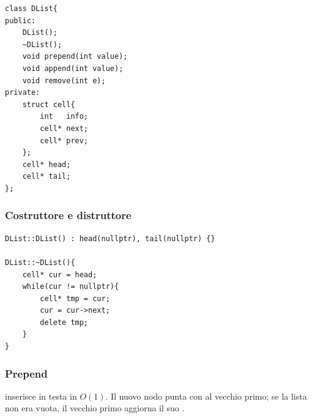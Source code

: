 \begin{codebox}
    \begin{lstlisting}
class DList{
public:
    DList();
    ~DList();
    void prepend(int value);
    void append(int value);
    void remove(int e);
private:
    struct cell{
        int   info;
        cell* next;
        cell* prev;
    };
    cell* head;
    cell* tail;
};
    \end{lstlisting}
\end{codebox}

\subsubsection{Costruttore e distruttore}

\begin{codebox}
    \begin{lstlisting}
DList::DList() : head(nullptr), tail(nullptr) {}

DList::~DList(){
    cell* cur = head;
    while(cur != nullptr){
        cell* tmp = cur;
        cur = cur->next;
        delete tmp;
    }
}
    \end{lstlisting}
\end{codebox}

\subsubsection{Prepend}
 inserisce in testa in $O(1)$. Il nuovo nodo punta con
 al vecchio primo; se la lista non era vuota, il vecchio primo
aggiorna il suo .

